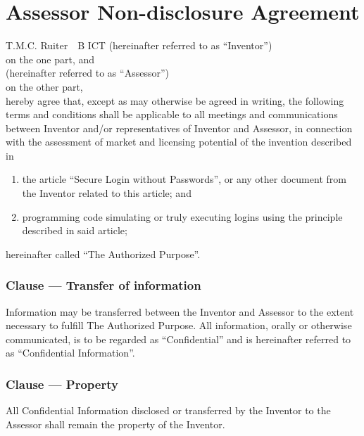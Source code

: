 \documentclass[a4paper]{article}
\newcounter{clausenr}
\newcommand{\clause}[1]{\addtocounter{clausenr}{1}\subsubsection{Clause \Roman{clausenr} --- #1}}
\begin{document}
\section{Assessor Non-disclosure Agreement}
\par
\vspace{1.5cm}
T.M.C. Ruiter\ \  B ICT\hfill
(hereinafter referred to as ``Inventor'')\\[.5cm]
on the one part, and\\[.5cm]
\hfill
(hereinafter referred to as ``Assessor'')\\[.5cm]
on the other part,\\[.5cm]
hereby agree that,
except as may otherwise be agreed in writing,
the following terms and conditions shall be applicable to all meetings and communications between
Inventor and/or representatives of Inventor and Assessor,
in connection with the assessment of market and licensing potential of the invention described in
\begin{enumerate}
\item the article ``Secure Login without Passwords'',
or any other document from the Inventor related to this article; and
\item programming code simulating or truly executing logins using the principle described in said article;
\end{enumerate}
hereinafter called ``The Authorized Purpose''.

\clause{Transfer of information}
Information may be transferred between the Inventor and Assessor to the extent necessary to fulfill The Authorized Purpose.
All information,
orally or otherwise communicated,
is to be regarded as ``Confidential'' and is hereinafter referred to as ``Confidential Information''.

\clause{Property}
All Confidential Information disclosed or transferred by the Inventor to the Assessor shall remain the property of the Inventor.
\end{document}
